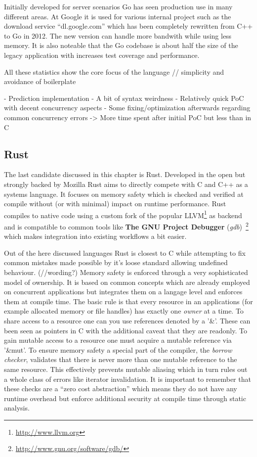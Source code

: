 Initially developed for server scenarios Go has seen production use in many different areas. At Google it is used for various internal project such as the download service ``dl.google.com'' which has been completely rewritten from C++ to Go in 2012. The new version can handle more bandwith while using less memory. It is also noteable that the Go codebase is about half the size of the legacy application with increases test coverage and performance.~\cite{go_dl_google}

All these statistics show the core focus of the language // simplicity and avoidance of boilerplate

- Prediction implementation
    - A bit of syntax weirdness
    - Relatively quick PoC with decent concurrency aspects
    - Some fixing/optimization afterwards regarding common concurrency errors
    -> More time spent after initial PoC but less than in C


\subsection*{Rust}
\label{subsec:State_of_the_art::Candidates::Rust}
The last candidate discussed in this chapter is Rust. Developed in the open but strongly backed by Mozilla Rust aims to directly compete with C and C++ as a systems language. It focuses on memory safety which is checked and verified at compile without (or with minimal) impact on runtime performance. Rust compiles to native code using a custom fork of the popular LLVM\footnote{\url{http://www.llvm.org}} as backend and is compatible to common tools like \textbf{The GNU Project Debugger} (\textit{gdb})~\footnote{\url{http://www.gnu.org/software/gdb/}} which makes integration into existing workflows a bit easier.

Out of the here discussed languages Rust is closest to C while attempting to fix common mistakes made possible by it's loose standard allowing undefined behaviour. (//wording?) Memory safety is enforced through a very sophisticated model of ownership. It is based on common concepts which are already employed on concurrent applications but integrates them on a langage level and enforces them at compile time. The basic rule is that every resource in an applications (for example allocated memory or file handles) has exactly one \textit{owner} at a time. To share access to a resource one can you use references denoted by a '\&'. These can been seen as pointers in C with the additional caveat that they are readonly. To gain mutable access to a resource one must acquire a mutable reference via '\&mut'. To ensure memory safety a special part of the compiler, the \textit{borrow checker}, validates that there is never more than one mutable reference to the same resource. This effectively prevents mutable aliasing which in turn rules out a whole class of errors like iterator invalidation. It is important to remember that these checks are a ``zero cost abstraction'' which means they do not have any runtime overhead but enforce additional security at compile time through static analysis.

